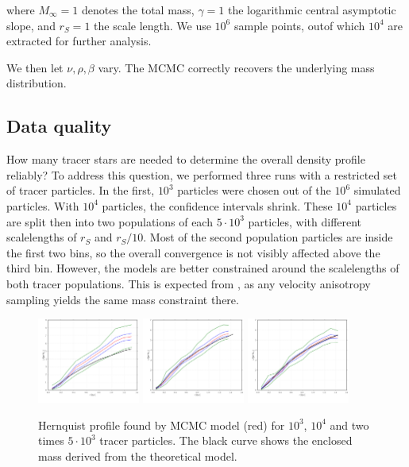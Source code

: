 where $M_\infty=1$ denotes the total mass, $\gamma=1$ the logarithmic
central asymptotic slope, and $r_S=1$ the scale length. We use $10^6$
sample points, outof which $10^4$ are extracted for further analysis.

We then let $\nu, \rho, \beta$ vary. The MCMC correctly recovers the
underlying mass distribution.



\subsection{Data quality}
How many tracer stars are needed to determine the overall density
profile reliably? To address this question, we performed three runs
with a restricted set of tracer particles. In the first, $10^3$
particles were chosen out of the $10^6$ simulated particles. With
$10^4$ particles, the confidence intervals shrink. These $10^4$
particles are split then into two populations of each $5\cdot10^3$
particles, with different scalelengths of $r_S$ and $r_S/10$. Most of
the second population particles are inside the first two bins, so the
overall convergence is not visibly affected above the third bin.
However, the models are better constrained around the scalelengths of
both tracer populations. This is expected from
\citet{WalkerPenarrubia2011}, as any velocity anisotropy sampling
yields the same mass constraint there.


\begin{figure}
\begin{center}
\hspace{-7mm}
\includegraphics[width=0.3\textwidth]{fig/hernquist1e3.pdf}
\includegraphics[width=0.3\textwidth]{fig/hernquist1e4.pdf}
\includegraphics[width=0.3\textwidth]{fig/hernquist2x5e3.pdf}
\caption{Hernquist profile found by MCMC model (red) for $10^3$,
  $10^4$ and two times $5\cdot10^3$ tracer particles. The black curve
  shows the enclosed mass derived from the theoretical model.}
\label{fig:hernquist1e3}
\end{center}
\end{figure}




